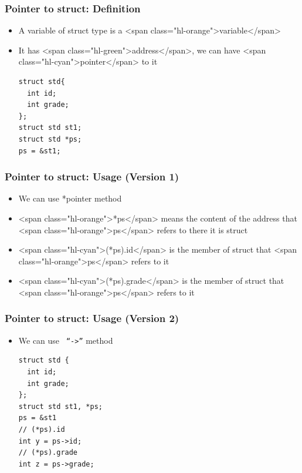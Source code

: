 \documentclass{../c-lecture}
\begin{document}
\begin{frame}[fragile]
  \frametitle{Pointer to struct: Definition}
  \begin{itemize}
    \item
      A variable of struct type is a <span class="hl-orange">variable</span>

    \item
      It has <span class="hl-green">address</span>, we can have
      <span class="hl-cyan">pointer</span> to it

    \begin{verbatim}
struct std{
  int id;
  int grade;
};
struct std st1;
struct std *ps;
ps = &st1;
    \end{verbatim}
  \end{itemize}
\end{frame}

\begin{frame}
  \frametitle{Pointer to struct: Usage (Version 1)}
  \begin{itemize}
    \item We can use *pointer method
    \item
      <span class="hl-orange">*ps</span> means the content of the address that
      <span class="hl-orange">ps</span> refers to there \textrightarrow it is struct

    \item
      <span class="hl-cyan">(*ps).id</span> is the member of struct that
      <span class="hl-orange">ps</span> refers to it

    \item
      <span class="hl-cyan">(*ps).grade</span> is the member of struct that
      <span class="hl-orange">ps</span> refers to it

  \end{itemize}
\end{frame}

\begin{frame}[fragile]
  \frametitle{Pointer to struct: Usage (Version 2)}
  \begin{itemize}
    \item We can use \texttt{\color{Orange} ``->''} method
    \begin{verbatim}
struct std {
  int id;
  int grade;
};
struct std st1, *ps;
ps = &st1
// (*ps).id
int y = ps->id;
// (*ps).grade
int z = ps->grade;
    \end{verbatim}
  \end{itemize}
\end{frame}
\end{document}
